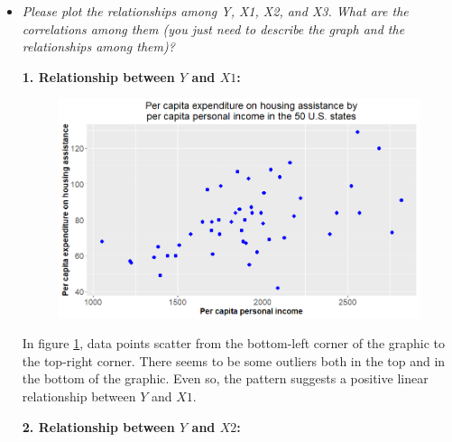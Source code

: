 \documentclass[12pt,letterpaper]{article}
\begin{document}
	\begin{itemize}
		
		\item
		\textit{Please plot the relationships among \emph{Y}, \emph{X1}, \emph{X2}, and \emph{X3}. What are the correlations among them (you just need to describe the graph and the relationships among them)?}\\
		
		\vspace{.5cm}
		
		\textbf{1. Relationship between $Y$ and $X1$:}

		\vspace{.5cm}
		
		
				
		\begin{figure}[H]
			\centering
			\caption{}
			\label{yx1}
			\includegraphics[width=0.9\linewidth]{Rplot1}
		\end{figure}
		
		In figure \ref{yx1}, data points scatter from the bottom-left corner of the graphic to the top-right corner. There seems to be some outliers both in the top and in the bottom of the graphic. Even so, the pattern suggests a positive linear relationship between $Y$ and $X1$.\\
		
		\newpage
		
		\textbf{2. Relationship between $Y$ and $X2$:}

		\vspace{.5cm}
		
		
		

\end{itemize}
\end{document}
